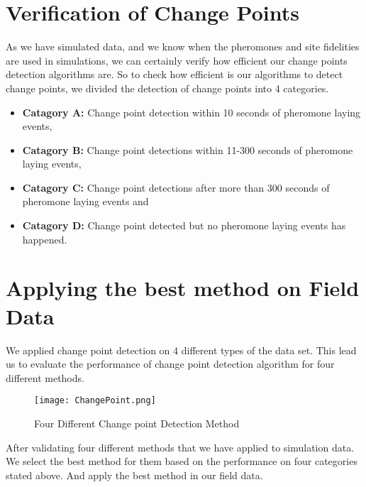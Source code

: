 \section{\label{section:Verification of Change Points}Verification of Change Points}
As we have simulated data, and we know when the pheromones and site fidelities are used in simulations, we can certainly verify how efficient our change points detection algorithms are. So to check how efficient is our algorithms to detect change points, we divided the detection of change points into 4 categories.
\begin{itemize}
	\item \textbf{Catagory A:} Change point detection within 10 seconds of pheromone laying events, 
	\item \textbf{Catagory B:} Change point detections within 11-300 seconds of pheromone laying events, 
	\item \textbf{Catagory C:} Change point detections after more than 300 seconds of pheromone laying events and 
	\item \textbf{Catagory D:} Change point detected but no pheromone laying events has happened. 
\end{itemize} 
\section{\label{section:Applying the best method on Field Data}Applying the best method on Field Data}
We applied change point detection on 4 different types of the data set. This lead us to evaluate the performance of change point detection algorithm for four different methods.
\begin{figure}[h]
	\texttt{[image: ChangePoint.png]}
	\caption{Four Different Change point Detection Method}
\end{figure}
After validating four different methods that we have applied to simulation data. We select the best method for them based on the performance on four categories stated above. And apply the best method in our field data.   

